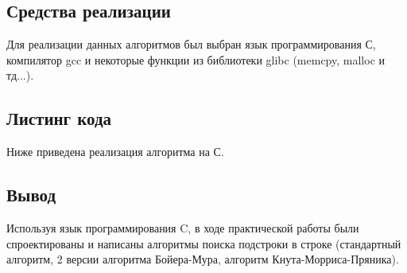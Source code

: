 \documentclass[a4paper,12pt]{article}
\begin{document}
\newpage
\subsection{Средства реализации}
Для реализации данных алгоритмов был выбран язык программирования С, компилятор gcc и некоторые функции из библиотеки glibc (memcpy, malloc и тд...). \\

\newpage
\subsection{Листинг кода}
Ниже приведена реализация алгоритма на С.\\

\newpage

\newpage

\newpage

\newpage

\newpage

\newpage

\newpage

\subsection{Вывод}
Используя язык программирования C, в ходе практической работы были спроектированы и написаны алгоритмы поиска подстроки в строке (стандартный алгоритм, 2 версии алгоритма Бойера-Мура, алгоритм Кнута-Морриса-Пряника).
\end{document}
